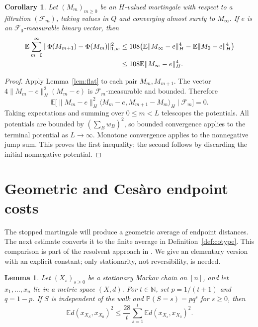 \documentclass[11pt]{article}
\newtheorem{lemma}[theorem]{Lemma}
\newtheorem{corollary}[theorem]{Corollary}
\theoremstyle{definition}
\theoremstyle{remark}
\numberwithin{equation}{section}
\newcommand{\N}{\mathbb N}
\newcommand{\E}{\mathbb E}
\newcommand{\Prob}{\mathbb P}
\newcommand{\calF}{\mathcal F}
\begin{document}
\begin{corollary}\label{cor:martingale}
Let $(M_m)_{m\geq0}$ be an $H$-valued martingale with respect to
a filtration $(\calF_m)$, taking values in $Q$ and converging
almost surely to $M_\infty$. If $e$ is an
$\calF_0$-measurable binary vector, then
\begin{align}
 \E\sum_{m=0}^\infty
 \|\Phi(M_{m+1})-\Phi(M_m)\|_{1,w}^2
 &\leq108\bigl(\E\|M_\infty-e\|_H^4
                    -\E\|M_0-e\|_H^4\bigr)\notag\\
 &\leq108\E\|M_\infty-e\|_H^4.
 \label{eq:martingale-energy}
\end{align}
\end{corollary}
\begin{proof}
Apply Lemma~\ref{lem:flat} to each pair $M_m,M_{m+1}$.
The vector $4\|M_m-e\|_H^2(M_m-e)$ is
$\calF_m$-measurable and bounded. Therefore
\[
 \E\bigl[\|M_m-e\|_H^2
       \langle M_m-e,M_{m+1}-M_m\rangle_H\mid\calF_m\bigr]=0.
\]
Taking expectations and summing over $0\leq m<L$ telescopes
the potentials. All potentials are bounded by
$(\sum_Bw_B)^2$, so bounded convergence applies to the terminal
potential as $L\to\infty$. Monotone convergence applies to the
nonnegative jump sum. This proves the first inequality; the
second follows by discarding the initial nonnegative potential.
\end{proof}

\section{Geometric and Ces\`aro endpoint costs}
\label{sec:comparison}

The stopped martingale will produce a geometric average of
endpoint distances. The next estimate converts it to the finite
average in Definition~\ref{def:cotype}. This comparison is part
of the resolvent approach in \cite[Section~7, especially
Lemma~7.1]{MendelNaor13}. We give an elementary version with an
explicit constant; only stationarity, not reversibility, is needed.

\begin{lemma}\label{lem:comparison}
Let $(X_s)_{s\geq0}$ be a stationary Markov chain on $[n]$,
and let $x_1,\ldots,x_n$ lie in a metric space $(X,d)$.
For $t\in\N$, set $p=1/(t+1)$ and $q=1-p$. If $S$ is
independent of the walk and $\Prob(S=s)=pq^s$ for $s\geq0$,
then
\begin{equation}\label{eq:comparison}
 \E d(x_{X_S},x_{X_0})^2
 \leq\frac{28}{t}\sum_{s=1}^t
                 \E d(x_{X_s},x_{X_0})^2.
\end{equation}
\end{lemma}
\end{document}
